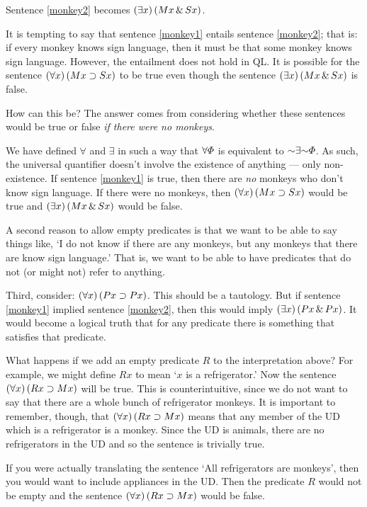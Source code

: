 Sentence \ref{monkey2} becomes $(\exists x) \,(Mx \,\&\, Sx)$.

It is tempting to say that sentence \ref{monkey1} entails sentence \ref{monkey2}; that is: if every monkey knows sign language, then it must be that some monkey knows sign language. However, the entailment does not hold in QL. It is possible for the sentence $(\forall x) \,(Mx \supset Sx)$ to be true even though the sentence $(\exists x) \,(Mx \,\&\, Sx)$ is false.

How can this be? The answer comes from considering whether these sentences would be true or false \emph{if there were no monkeys}.

We have defined $\forall$ and $\exists$ in such a way that $\forall\varPhi{}$ is equivalent to $\enot \exists\enot \metaA{}$. As such, the universal quantifier doesn't involve the existence of anything --- only non-existence. If sentence \ref{monkey1} is true, then there are \emph{no} monkeys who don't know sign language. If there were no monkeys, then $(\forall x) \,(Mx \supset Sx)$ would be true and $(\exists x) \,(Mx \,\&\, Sx)$ would be false.

A second reason to allow empty predicates is that we want to be able to say things like, `I do not know if there are any monkeys, but any monkeys that there are know sign language.' That is, we want to be able to have predicates that do not (or might not) refer to anything.

Third, consider: $(\forall x) \, (Px \supset Px)$. This should be a tautology. But if sentence \ref{monkey1} implied sentence \ref{monkey2}, then this would imply $(\exists x) \, (Px \,\&\, Px)$. It would become a logical truth that for any predicate there is something that satisfies that predicate.

What happens if we add an empty predicate $R$ to the interpretation above? For example, we might define $Rx$ to mean `$x$ is a refrigerator.' Now the sentence $(\forall x) \,(Rx \supset Mx)$ will be true. This is counterintuitive, since we do not want to say that there are a whole bunch of refrigerator monkeys. It is important to remember, though, that $(\forall x) \,(Rx \supset Mx)$ means that any member of the UD which is a refrigerator is a monkey. Since the UD is animals, there are no refrigerators in the UD and so the sentence is trivially true.

If you were actually translating the sentence `All refrigerators are monkeys', then you would want to include appliances in the UD. Then the predicate $R$ would not be empty and the sentence $(\forall x) \,(Rx \supset Mx)$ would be false.


